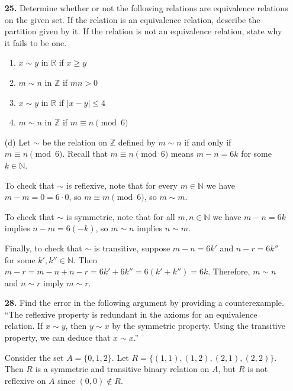 \documentclass[12pt,reqno]{amsart}
\newcommand{\N}{\ensuremath{\mathbb{N}}}
\newcommand{\Z}{\ensuremath{\mathbb{Z}}}
\begin{document}
\begin{enumerate}[{\bf 1.}]
\bigskip

\item[{\bf 25.}]
Determine whether or not the following relations are equivalence relations on the given set.  If the relation is an equivalence relation, describe the partition given by it.  If the relation is not an equivalence relation, state why it fails to be one.
\begin{multicols}{2}
\begin{enumerate}
 
\item
$x \sim y$ in ${\mathbb R}$ if $x \geq y$
 
\item
$m \sim n$ in ${\mathbb Z}$ if $mn > 0$
 
\item
$x \sim y$ in ${\mathbb R}$ if $|x - y| \leq 4$
 
\item
$m \sim n$ in ${\mathbb Z}$ if $m \equiv n \pmod{6}$
 
\end{enumerate}
\end{multicols}
 
\bigskip
{}
\medskip
\noindent (d) 
Let $\sim$ be the relation on $\Z$ defined by 
$m \sim n$ if and only if $m \equiv n \pmod{6}$.
Recall that $m\equiv n \pmod 6$ means $m-n = 6k$ for some $k\in \N$.  

\medskip

\noindent To check that $\sim$ is reflexive, note that for every $m \in \N$ 
we have $m - m = 0 = 6\cdot 0$, so $m \equiv m \pmod{6}$, so $m\sim m$.

\medskip

\noindent To check that $\sim$ is symmetric, note that for all $m, n \in \N$ 
we have $m - n = 6k$ implies $n - m = 6(-k)$, so $m \sim n$ implies $n \sim m$.

\medskip

\noindent Finally, to check that $\sim$ is transitive, suppose 
$m - n = 6k'$ and $n - r = 6k''$ for some $k', k'' \in \N$.  Then
$m - r = m-n + n-r = 6k' + 6k'' = 6(k'+k'') = 6k$.  Therefore,
$m\sim n$ and $n\sim r$ imply $m\sim r$.


\bigskip

 
\item[{\bf 28.}]
Find the error in the following argument by providing a counterexample. ``The
reflexive property is redundant in the axioms for an equivalence relation.  If
$x \sim y$, then $y \sim x$ by the symmetric property.  Using the transitive
property, we can deduce that $x \sim x$.''
 
\bigskip
{}
Consider the set $A = \{0, 1, 2\}$.  Let $R = \{(1,1), (1,2), (2,1), (2,2)\}$.
Then $R$ is a symmetric and transitive binary relation on $A$, but $R$ is not
reflexive on $A$ since $(0,0) \notin R$.

\end{enumerate}
\end{document}
